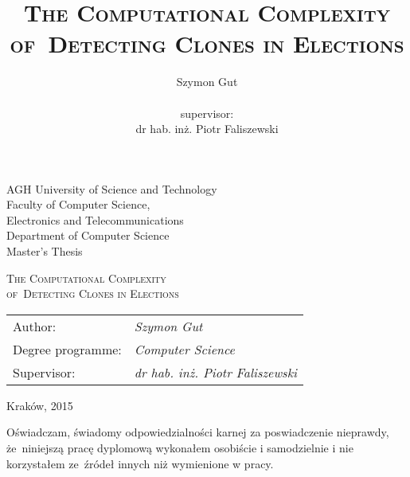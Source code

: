 \documentclass[a4paper,12pt]{report}
\author{Szymon Gut\\\newline\\supervisor:\\dr hab. inż. Piotr Faliszewski}
\title{\textsc{The Computational Complexity of~Detecting Clones in Elections}}
\date{}
\theoremstyle{plain}
\theoremstyle{definition}
\theoremstyle{remark}
\begin{document}
\begin{titlepage}
\begin{center}
{\Large AGH University of Science and Technology}\\[0.2cm]
{\Large Faculty of Computer Science,\\Electronics and Telecommunications}\\[0.25cm]
{\Large Department of Computer Science}\\[1.5cm]

{\Large Master's Thesis}\\[1.0cm]

\begin{spacing}{2}
\textsc{\huge The Computational Complexity\\of~Detecting Clones in Elections}\\[3cm]
\end{spacing}

\end{center}

\vfill
\begin{flushleft}
\begin{tabular}{p{45mm}l}
\large Author: & {\large \itshape Szymon Gut}\\[-1mm]
\large Degree programme: & {\large \itshape Computer Science}\\[-1mm]
\large Supervisor: & {\large \itshape dr hab. inż. Piotr Faliszewski}\\[2.0cm]
\end{tabular}
\end{flushleft}

\begin{center}
Kraków, 2015
\end{center}

\clearpage

\sloppy
Oświadczam, świadomy odpowiedzialności karnej za poswiadczenie nieprawdy,
że~niniejszą pracę dyplomową wykonałem osobiście i samodzielnie i nie korzystałem
ze~źródeł innych niż wymienione w pracy.


\end{titlepage}



\end{document}

